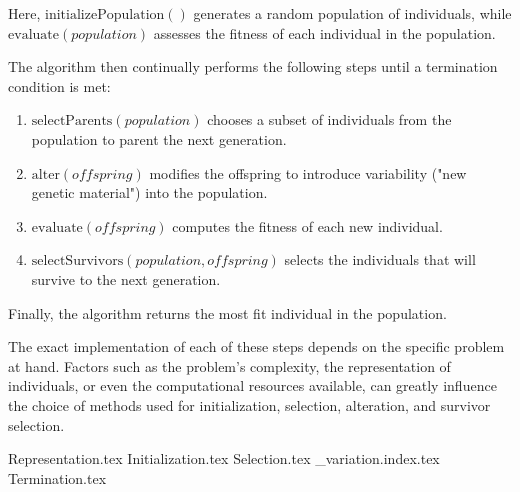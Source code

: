   Here, \(\mathrm{initializePopulation()}\) generates a random population of individuals, while
  \(\mathrm{evaluate}(\mathit{population})\) assesses the fitness of each individual in the population.

  The algorithm then continually performs the following steps until a termination condition is met:

  \begin{enumerate}
    \item \(\mathrm{selectParents}(\mathit{population})\) chooses a subset of individuals from the population to parent the next generation.
    \item \(\mathrm{alter}(\mathit{offspring})\) modifies the offspring to introduce variability ("new genetic material") into the population.
    \item \(\mathrm{evaluate}(\mathit{offspring})\) computes the fitness of each new individual.
    \item \(\mathrm{selectSurvivors}(\mathit{population}, \mathit{offspring})\) selects the individuals that will survive to the next generation.
  \end{enumerate}

  Finally, the algorithm returns the most fit individual in the population.

  The exact implementation of each of these steps depends on the specific problem at hand. Factors such as the problem's complexity, the representation of individuals, or even the computational resources available, can greatly influence the choice of methods used for initialization, selection, alteration, and survivor selection.

  {Representation.tex}
  {Initialization.tex}
  {Selection.tex}
  {_variation.index.tex}
  {Termination.tex}
